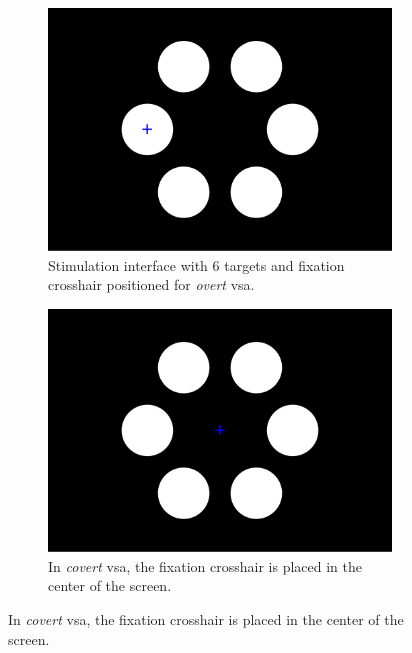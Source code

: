 \documentclass[twocolumn]{article}
\begin{document}
\begin{figure}[t]
\begin{minipage}[b]{.54\textwidth}
\begin{subfigure}[b]{.45\linewidth}
      \includegraphics[width=\textwidth]{figures/stim_overt.pdf}
      \caption{Stimulation interface with 6 targets and fixation crosshair
      positioned for \emph{overt} \ac{vsa}.}
    \end{subfigure}\hfill%
    \begin{subfigure}[b]{.45\linewidth}
      \includegraphics[width=\textwidth]{figures/stim_covert.pdf}
      \caption{In \emph{covert} \ac{vsa}, the fixation crosshair is placed in the
      center of the screen.}
    \end{subfigure}
    \smallskip


\end{minipage}
\end{figure}
\end{document}
